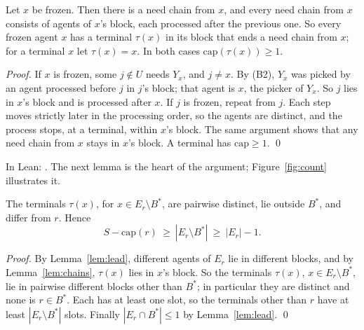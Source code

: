 \documentclass[runningheads,11pt]{llncs}
\newcommand{\capa}{\mathrm{cap}}
\begin{document}
\begin{lemma}\label{lem:chains}
Let $x$ be frozen. Then there is a need chain from $x$, and every need chain from $x$ consists of agents of $x$'s block, each processed after the previous one. So every frozen agent $x$ has a terminal $\tau(x)$ in its block that ends a need chain from $x$; for a terminal $x$ let $\tau(x)=x$. In both cases $\capa(\tau(x))\ge1$.
\end{lemma}

\begin{proof}
If $x$ is frozen, some $j\notin U$ needs $Y_x$, and $j\ne x$. By (B2), $Y_x$ was picked by an agent processed before $j$ in $j$'s block; that agent is $x$, the picker of $Y_x$. So $j$ lies in $x$'s block and is processed after $x$. If $j$ is frozen, repeat from $j$. Each step moves strictly later in the processing order, so the agents are distinct, and the process stops, at a terminal, within $x$'s block. The same argument shows that any need chain from $x$ stays in $x$'s block. A terminal has $\capa\ge1$. \qed
\end{proof}

\noindent In Lean: . The next lemma is the heart of the argument; Figure~\ref{fig:count} illustrates it.

\begin{lemma}[counting]\label{lem:count}
The terminals $\tau(x)$, for $x\in E_r\setminus B^*$, are pairwise distinct, lie outside $B^*$, and differ from $r$. Hence
\[
  S-\capa(r)\ \ge\ |E_r\setminus B^*|\ \ge\ |E_r|-1 .
\]
\end{lemma}

\begin{proof}
By Lemma~\ref{lem:lead}, different agents of $E_r$ lie in different blocks, and by Lemma~\ref{lem:chains}, $\tau(x)$ lies in $x$'s block. So the terminals $\tau(x)$, $x\in E_r\setminus B^*$, lie in pairwise different blocks other than $B^*$; in particular they are distinct and none is $r\in B^*$. Each has at least one slot, so the terminals other than $r$ have at least $|E_r\setminus B^*|$ slots. Finally $|E_r\cap B^*|\le1$ by Lemma~\ref{lem:lead}. \qed
\end{proof}
\end{document}
